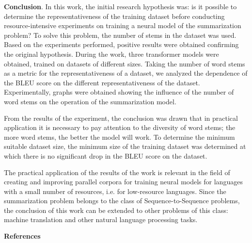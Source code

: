 \begin{multicols}{2}
{\bfseries Conclusion}. In this work, the initial research hypothesis was:
is it possible to determine the representativeness of the training
dataset before conducting resource-intensive experiments on training a
neural model of the summarization problem? To solve this problem, the
number of stems in the dataset was used. Based on the experiments
performed, positive results were obtained confirming the original
hypothesis. During the work, three transformer models were obtained,
trained on datasets of different sizes. Taking the number of word stems
as a metric for the representativeness of a dataset, we analyzed the
dependence of the BLEU score on the different representativeness of the
dataset. Experimentally, graphs were obtained showing the influence of
the number of word stems on the operation of the summarization model.

From the results of the experiment, the conclusion was drawn that in
practical application it is necessary to pay attention to the diversity
of word stems; the more word stems, the better the model will work. To
determine the minimum suitable dataset size, the minimum size of the
training dataset was determined at which there is no significant drop in
the BLEU score on the dataset.

The practical application of the results of the work is relevant in the
field of creating and improving parallel corpora for training neural
models for languages \hspace{0pt}\hspace{0pt}with a small number of
resources, i.e. for low-resource languages. Since the summarization
problem belongs to the class of Sequence-to-Sequence problems, the
conclusion of this work can be extended to other problems of this class:
machine translation and other natural language processing tasks.
\end{multicols}

\begin{center}
{\bfseries References}
\end{center}

